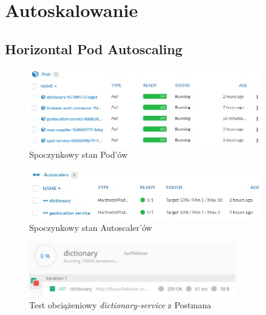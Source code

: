 \chapter{Autoskalowanie}
\label{cha:autoscaling}

\section{Horizontal Pod Autoscaling}

\begin{figure}[!ht]
	\begin{center}
		\includegraphics[width=0.9\textwidth]{img/autoscaling/hpa-pods-normal}
	\end{center}
    \caption{Spoczynkowy stan Pod'ów}
\end{figure}

\begin{figure}[!ht]
	\begin{center}
		\includegraphics[width=0.9\textwidth]{img/autoscaling/hpa-autoscalers-normal}
	\end{center}
    \caption{Spoczynkowy stan Autoscaler'ów}
\end{figure}

\begin{figure}[!ht]
	\begin{center}
		\includegraphics[width=0.8\textwidth]{img/autoscaling/hpa-dictionary-test-postman}
	\end{center}
    \caption{Test obciążeniowy \emph{dictionary-service} z Postmana}
\end{figure}

